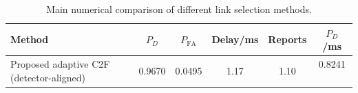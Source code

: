 \begin{table}[t]
    \centering
    \caption{Main numerical comparison of different link selection methods.}
    \label{tab:main_summary}
    \begin{tabular}{l c c c c c}
        \hline
        Method & $P_D$ & $P_{\mathrm{FA}}$ & Delay/ms & Reports & $P_D$/ms \\
        \hline
        Proposed adaptive C2F (detector-aligned) & 0.9670 & 0.0495 & 1.17 & 1.10 & 0.8241 \
        \hline
    \end{tabular}
\end{table}
